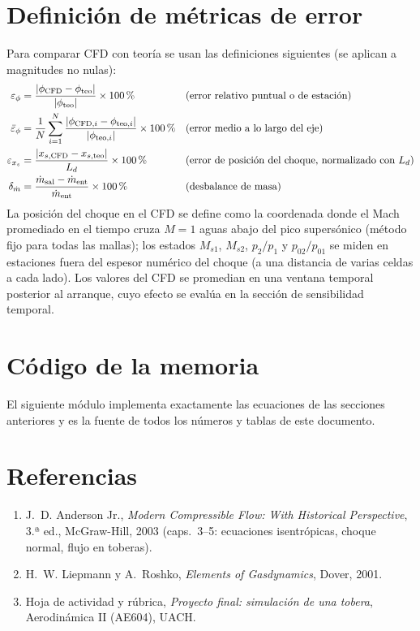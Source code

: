 \documentclass[11pt,a4paper]{article}
\begin{document}
\section{Definición de métricas de error}
Para comparar CFD con teoría se usan las definiciones siguientes (se aplican a magnitudes no nulas):
\begin{align}
\varepsilon_\phi&=\frac{|\phi_{\rm CFD}-\phi_{\rm teo}|}{|\phi_{\rm teo}|}\times100\,\%&&\text{(error relativo puntual o de estación)}\\
\bar\varepsilon_\phi&=\frac1N\sum_{i=1}^{N}\frac{|\phi_{{\rm CFD},i}-\phi_{{\rm teo},i}|}{|\phi_{{\rm teo},i}|}\times100\,\%&&\text{(error medio a lo largo del eje)}\\
\varepsilon_{x_s}&=\frac{|x_{s,\rm CFD}-x_{s,\rm teo}|}{L_d}\times100\,\%&&\text{(error de posición del choque, normalizado con $L_d$)}\\
\delta_{\dot m}&=\frac{\dot m_{\rm sal}-\dot m_{\rm ent}}{\dot m_{\rm ent}}\times100\,\%&&\text{(desbalance de masa)}
\end{align}
La posición del choque en el CFD se define como la coordenada donde el Mach promediado en el tiempo cruza $M=1$ aguas abajo del pico supersónico
(método fijo para todas las mallas); los estados $M_{s1}$, $M_{s2}$, $p_2/p_1$ y $p_{02}/p_{01}$ se miden en estaciones fuera del espesor numérico del choque
(a una distancia de varias celdas a cada lado). Los valores del CFD se promedian en una ventana temporal posterior al arranque, cuyo efecto se evalúa en la sección de sensibilidad temporal.

\appendix
\section{Código de la memoria}
El siguiente módulo implementa exactamente las ecuaciones de las secciones anteriores y es la fuente de todos los números y tablas de este documento.


\section*{Referencias}
\begin{enumerate}[leftmargin=2em]
\item J.~D. Anderson Jr., \emph{Modern Compressible Flow: With Historical Perspective}, 3.ª ed., McGraw-Hill, 2003 (caps.~3--5: ecuaciones isentrópicas, choque normal, flujo en toberas).
\item H.~W. Liepmann y A.~Roshko, \emph{Elements of Gasdynamics}, Dover, 2001.
\item Hoja de actividad y rúbrica, \emph{Proyecto final: simulación de una tobera}, Aerodinámica II (AE604), UACH.
\end{enumerate}
\end{document}
